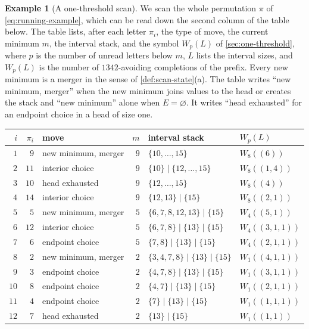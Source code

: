 \documentclass[11pt,reqno]{amsart}
\theoremstyle{definition}
\newtheorem{example}[example]{Example}
\theoremstyle{remark}
\begin{document}
\begin{example}[A one-threshold scan]\label{ex:1342-scan}
We scan the whole permutation $\pi$ of \eqref{eq:running-example}, which can be
read down the second column of the table below.
The table lists, after each letter $\pi_i$, the type of move, the current
minimum $m$, the interval stack, and the symbol $W_p(L)$ of
\cref{sec:one-threshold}, where $p$ is the number of unread letters below
$m$, $L$ lists the interval sizes, and $W_p(L)$ is the number of
$1342$-avoiding completions of the prefix.  Every new minimum is a merger
in the sense of \cref{def:scan-state}(a).  The table writes ``new minimum, merger'' when
the new minimum joins values to the head or creates the stack and ``new
minimum'' alone when $E=\varnothing$.  It writes ``head exhausted'' for an
endpoint choice in a head of size one.
\begin{center}
\small
\setlength{\tabcolsep}{4.5pt}
\begin{tabular}{@{}rrlrll@{}}
\toprule
$i$ & $\pi_i$ & move & $m$ & interval stack & $W_p(L)$ \\
\midrule
$1$ & $9$ & new minimum, merger & $9$ & $\{10,\ldots,15\}$ & $W_{8}((6))$ \\
$2$ & $11$ & interior choice & $9$ & $\{10\}\mid\{12,\ldots,15\}$ & $W_{8}((1,4))$ \\
$3$ & $10$ & head exhausted & $9$ & $\{12,\ldots,15\}$ & $W_{8}((4))$ \\
$4$ & $14$ & interior choice & $9$ & $\{12,13\}\mid\{15\}$ & $W_{8}((2,1))$ \\
$5$ & $5$ & new minimum, merger & $5$ & $\{6,7,8,12,13\}\mid\{15\}$ & $W_{4}((5,1))$ \\
$6$ & $12$ & interior choice & $5$ & $\{6,7,8\}\mid\{13\}\mid\{15\}$ & $W_{4}((3,1,1))$ \\
$7$ & $6$ & endpoint choice & $5$ & $\{7,8\}\mid\{13\}\mid\{15\}$ & $W_{4}((2,1,1))$ \\
$8$ & $2$ & new minimum, merger & $2$ & $\{3,4,7,8\}\mid\{13\}\mid\{15\}$ & $W_{1}((4,1,1))$ \\
$9$ & $3$ & endpoint choice & $2$ & $\{4,7,8\}\mid\{13\}\mid\{15\}$ & $W_{1}((3,1,1))$ \\
$10$ & $8$ & endpoint choice & $2$ & $\{4,7\}\mid\{13\}\mid\{15\}$ & $W_{1}((2,1,1))$ \\
$11$ & $4$ & endpoint choice & $2$ & $\{7\}\mid\{13\}\mid\{15\}$ & $W_{1}((1,1,1))$ \\
$12$ & $7$ & head exhausted & $2$ & $\{13\}\mid\{15\}$ & $W_{1}((1,1))$ \\

\end{tabular}
\end{center}
\end{example}
\end{document}
